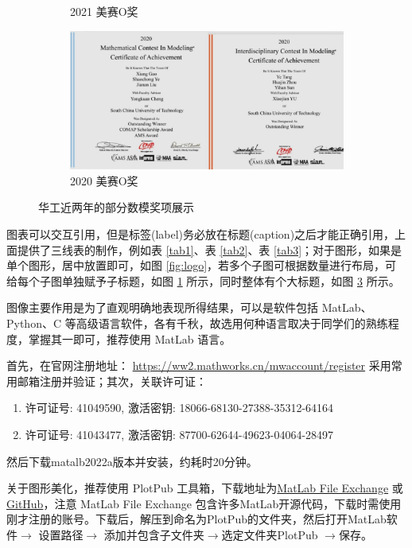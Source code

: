 \documentclass[12pt,utf8]{article}
\begin{document}
\begin{figure}[H]
\begin{subfigure}{0.4\textwidth}
    \caption{2021 美赛O奖}
    \label{fig:second}
\end{subfigure}
\hfill
\begin{subfigure}{0.9\textwidth}
    \includegraphics[width=\textwidth]{./figures/MCM2020}
    \caption{2020 美赛O奖}
    \label{fig:third}
\end{subfigure}
        
\caption{华工近两年的部分数模奖项展示}
\label{fig:figures}

\end{figure}


图表可以交互引用，但是标签(label)务必放在标题(caption)之后才能正确引用，上面提供了三线表的制作，例如表 \ref{tab1}、表 \ref{tab2}、表 \ref{tab3}；对于图形，如果是单个图形，居中放置即可，如图 \ref{fig:logo}，若多个子图可根据数量进行布局，可给每个子图单独赋予子标题，如图 \ref{fig:second} 所示，同时整体有个大标题，如图 \ref{fig:figures} 所示。

图像主要作用是为了直观明确地表现所得结果，可以是软件包括 MatLab、Python、C 等高级语言软件，各有千秋，故选用何种语言取决于同学们的熟练程度，掌握其一即可，推荐使用 MatLab 语言。

首先，在官网注册地址：
\href{https://ww2.mathworks.cn/mwaccount/register}{https://ww2.mathworks.cn/mwaccount/register} 采用常用邮箱注册并验证；其次，关联许可证：
     \begin{enumerate}
     \item 许可证号: 41049590,    
     激活密钥: 18066-68130-27388-35312-64164
     \item 许可证号: 41043477,    
          激活密钥: 87700-62644-49623-04064-28497
     \end{enumerate}   
然后下载matalb2022a版本并安装，约耗时20分钟。

关于图形美化，推荐使用 PlotPub 工具箱，下载地址为\href{https://www.mathworks.com/matlabcentral/fileexchange/47921-plotpub-publication-quality-graphs-in-matlab}{MatLab File Exchange} 或 \href{https://github.com/masumhabib/PlotPub}{GitHub}，注意 MatLab File Exchange 包含许多MatLab开源代码，下载时需使用刚才注册的账号。下载后，解压到命名为PlotPub的文件夹，然后打开MatLab软件$ \rightarrow $ 设置路径$ \rightarrow $ 添加并包含子文件夹$ \rightarrow $选定文件夹PlotPub $\rightarrow $保存。
\end{document}

